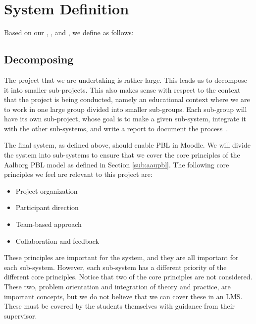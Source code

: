 \chapter{System Definition}
\label{sec:systemDef}
\label{chap:systemDef}
Based on our , , and , we define \system{} as follows:


\section{Decomposing \system}
\label{sub:decomposingSys}
The project that we are undertaking is rather large.
This leads us to decompose it into smaller sub-projects.
This also makes sense with respect to the context that the project is being conducted, namely an educational context where we are to work in one large group divided into smaller sub-groups. 
Each sub-group will have its own sub-project, whose goal is to make a given sub-system, integrate it with the other sub-systems, and write a report to document the process~\cite{sw6studieordning}.

The final system, as defined above, should enable PBL in Moodle.
We will divide the system into sub-systems to ensure that we cover the core principles of the Aalborg PBL model as defined in Section \ref{sub:aaupbl}.
The following core principles we feel are relevant to this project are:

\begin{itemize}
	\item Project organization
  \item Participant direction
  \item Team-based approach
  \item Collaboration and feedback
\end{itemize}

These principles are important for the system, and they are all important for each sub-system.
However, each sub-system has a different priority of the different core principles.
Notice that two of the core principles are not considered.
These two, problem orientation and integration of theory and practice, are important concepts, but we do not believe that we can cover these in an LMS.
These must be covered by the students themselves with guidance from their supervisor.

